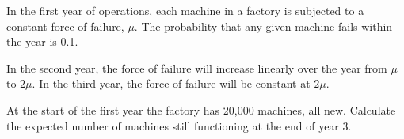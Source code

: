 In the first year of operations, each machine in a factory is subjected to a constant force
of failure, $\mu.$ The probability that any given machine fails within the year is 0.1.

In the second year, the force of failure will increase linearly over the year from $\mu$ to $2\mu.$
In the third year, the force of failure will be constant at $2\mu.$

At the start of the first year the factory has 20,000 machines, all new. Calculate the
expected number of machines still functioning at the end of year 3.


